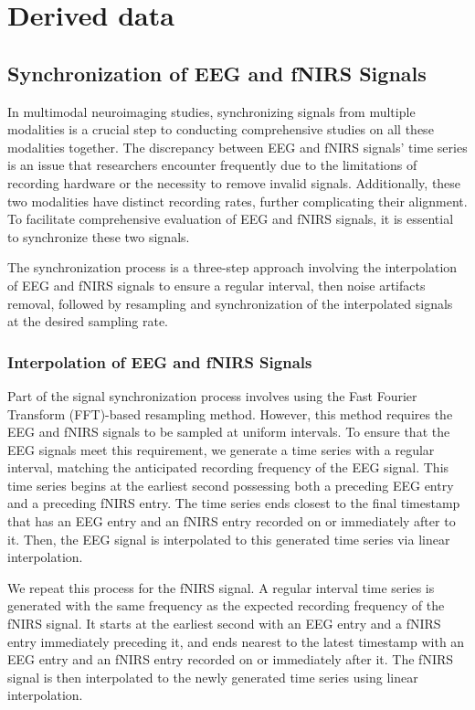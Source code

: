 \section{Derived data}

\subsection{Synchronization of EEG and fNIRS Signals}

In multimodal neuroimaging studies, synchronizing signals from multiple modalities is a crucial step to conducting comprehensive studies on all these modalities together. The discrepancy between EEG and fNIRS signals' time series is an issue that researchers encounter frequently due to the limitations of recording hardware or the necessity to remove invalid signals. Additionally, these two modalities have distinct recording rates, further complicating their alignment. To facilitate comprehensive evaluation of EEG and fNIRS signals, it is essential to synchronize these two signals.

The synchronization process is a three-step approach involving the interpolation of EEG and fNIRS signals to ensure a regular interval, then noise artifacts removal, followed by resampling and synchronization of the interpolated signals at the desired sampling rate.

\subsubsection{Interpolation of EEG and fNIRS Signals}

Part of the signal synchronization process involves using the Fast Fourier Transform (FFT)-based resampling method. However, this method requires the EEG and fNIRS signals to be sampled at uniform intervals. To ensure that the EEG signals meet this requirement, we generate a time series with a regular interval, matching the anticipated recording frequency of the EEG signal. This time series begins at the earliest second possessing both a preceding EEG entry and a preceding fNIRS entry. The time series ends closest to the final timestamp that has an EEG entry and an fNIRS entry recorded on or immediately after to it. Then, the EEG signal is interpolated to this generated time series via linear interpolation.

We repeat this process for the fNIRS signal. A regular interval time series is generated with the same frequency as the expected recording frequency of the fNIRS signal. It starts at the earliest second with an EEG entry and a fNIRS entry immediately preceding it, and ends nearest to the latest timestamp with an EEG entry and an fNIRS entry recorded on or immediately after it. The fNIRS signal is then interpolated to the newly generated time series using linear interpolation.

